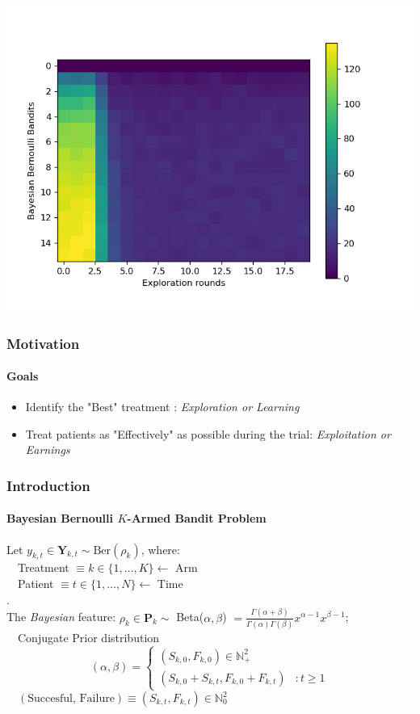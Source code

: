 \documentclass[12pt, aspectratio=169, mathserif]{beamer}
\begin{document}
  \begin{frame}[t]
    \vspace{-1cm}
    \begin{center}
      \includegraphics[height=1.1\textheight]{Figure 7.png}
    \end{center}
  \end{frame}
  \begin{frame}[t]
    \frametitle{Motivation}
    \framesubtitle{Goals}
    \begin{itemize}
      \item Identify the "Best" treatment : \textit{Exploration or Learning}
      \item Treat patients as "Effectively" as possible during the trial: 
      \textit{Exploitation or Earnings}
    \end{itemize}
  \end{frame}
  \begin{frame}[t]
    \frametitle{Introduction}
    \framesubtitle{Bayesian Bernoulli $K$-Armed Bandit Problem}
    Let $y_{k, t}\in \mathbf{Y}_{k, t}\sim \text{Ber}(\rho_{k})$, where:\\
    $\quad$Treatment $\equiv k\in\{1,\ldots, K\}\leftarrow$ Arm\\
    $\quad$Patient $\equiv t\in\{1,\ldots,N\}\leftarrow$ Time\\
    \color{white}.\color{black}\\
    The \textit{Bayesian} feature: $\rho_k \in \mathbf{P}_k\sim$ Beta($\alpha, \beta$)
    $ = \frac{\Gamma(\alpha + \beta)}{\Gamma(\alpha)\Gamma(\beta)}x^{\alpha - 1}
    x^{\beta - 1}$; \\
    $\quad$Conjugate Prior distribution\\
    \begin{equation*}
      (\alpha, \beta)=\left\{\begin{matrix}
        (S_{k, 0}, F_{k, 0})\in \mathbb{N}_+^2&\\
        (S_{k, 0} + S_{k, t}, F_{k, 0} + F_{k, t})&: t \geq 1
    \end{matrix}\right.
  \end{equation*}
  $\quad(\text{Succesful, Failure})\equiv(S_{k, t}, F_{k, t})\in\mathbb{N}_0^2$ 
  \end{frame}
\end{document}
